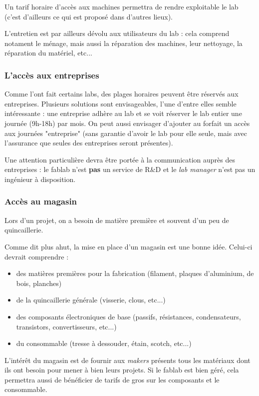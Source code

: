 Un tarif horaire d'accès aux machines permettra de rendre exploitable le lab (c'est d'ailleurs ce qui est proposé dans
d'autres lieux).

L'entretien est par ailleurs dévolu aux utilisateurs du lab : cela comprend notament le ménage, mais aussi la réparation
des machines, leur nettoyage, la réparation du matériel, etc...

\subsubsection{L'accès aux entreprises}

Comme l'ont fait certains labs, des plages horaires peuvent être réservés aux entreprises. Plusieurs solutions sont
envisageables, l'une d'entre elles semble intéressante : une entreprise adhère au lab et se voit réserver le lab entier une journée
(9h-18h) par mois. On peut aussi envisager d'ajouter au forfait un accès aux journées "entreprise" (sans garantie
d'avoir le lab pour elle seule, mais avec l'assurance que seules des entreprises seront présentes).

Une attention particulière devra être portée à la communication auprès des entreprises : le fablab n'est \textbf{pas} un
service de R\&D et le \textit{lab manager} n'est pas un ingénieur à disposition.

\subsubsection{Accès au magasin}


Lors d'un projet, on a besoin de matière première et souvent d'un peu de quincaillerie.

Comme dit plus ahut, la mise en place d'un magasin est une bonne idée. Celui-ci devrait comprendre :

\begin{itemize}
	\item des matières premières pour la fabrication (filament, plaques d'aluminium, de bois, planches)
	\item de la quincaillerie générale (visserie, clous, etc...)
	\item des composants électroniques de base (passifs, résistances, condensateurs, transistors, convertisseurs, etc...)
	\item du consommable (tresse à dessouder, étain, scotch, etc...)
\end{itemize}

L'intérêt du magasin est de fournir aux \textit{makers} présents tous les matériaux dont ils ont besoin pour mener à bien leurs
projets. Si le fablab est bien géré, cela permettra aussi de bénéficier de tarifs de gros sur les composants et le
consommable.

